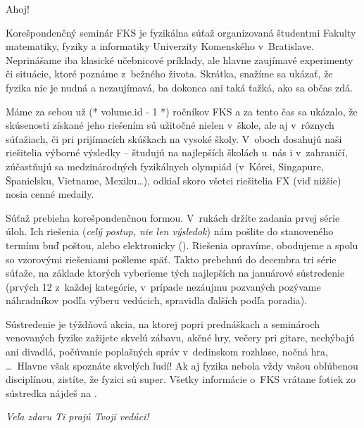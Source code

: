 Ahoj!

Korešpondenčný seminár FKS je fyzikálna súťaž organizovaná študentmi Fakulty
matematiky, fyziky a informatiky Univerzity Komenského v~Bratislave. Neprinášame
iba klasické učebnicové príklady, ale hlavne zaujímavé experimenty či situácie,
ktoré poznáme z~bežného života. Skrátka, snažíme sa ukázať, že fyzika nie je
nudná a nezaujímavá, ba dokonca ani taká ťažká, ako sa občas zdá.

Máme za sebou už (* volume.id - 1 *) ročníkov FKS a za tento čas sa ukázalo, že skúsenosti 
získané jeho riešením sú užitočné nielen v~škole, ale aj v~rôznych súťažiach, či
pri prijímacích skúškach na vysoké školy. V~oboch dosahujú naši riešitelia
výborné výsledky -- študujú na najlepších školách u~nás i v~zahraničí,
zúčastňujú sa medzinárodných fyzikálnych olympiád (v~Kórei, Singapure,
Španielsku, Vietname, Mexiku\dots), odkiaľ skoro všetci riešitelia FX (viď nižšie)
nosia cenné medaily.

Súťaž prebieha korešpondenčnou formou. V~rukách držíte zadania prvej série úloh.
Ich riešenia (\emph{celý postup, nie len výsledok}) nám pošlite do stanoveného termínu
buď poštou, alebo elektronicky (). Riešenia opravíme,
obodujeme a spolu so vzorovými riešeniami pošleme späť. Takto prebehnú do
decembra tri série súťaže, na základe ktorých vyberieme tých najlepších na
januárové sústredenie (prvých 12 z~každej kategórie, v~prípade nezáujmu
pozvaných pozývame náhradníkov podľa výberu vedúcich, spravidla ďalších podľa
poradia).

Sústredenie je týždňová akcia, na ktorej popri prednáškach a seminároch
venovaných fyzike zažijete skvelú zábavu, akčné hry, večery pri gitare,
nechýbajú ani divadlá, počúvanie poplašných správ v~dedinskom rozhlase, nočná
hra, \dots\ Hlavne však spoznáte skvelých ľudí! Ak aj fyzika nebola vždy vašou
obľúbenou disciplínou, zistíte, že fyzici sú super.  Všetky informácie o~FKS
vrátane fotiek zo sústredka nájdeš na .

\hfill \emph{Veľa zdaru Ti prajú Tvoji vedúci!}%
